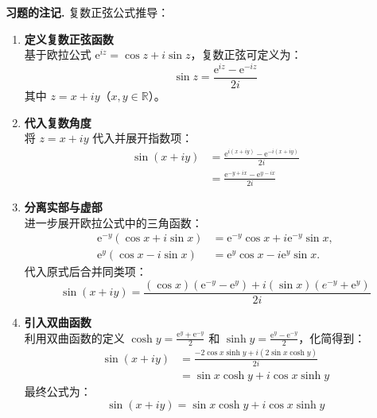 \documentclass[11pt]{ctexart}
\newcounter{problemname}
\newenvironment{note}{\par\noindent\textbf{习题\arabic{problemname}的注记. }}{\par}
\begin{document}
\begin{note}
    复数正弦公式推导：
    \begin{enumerate}
        \item \textbf{定义复数正弦函数}\\  
        基于欧拉公式 $\text{e}^{iz} = \cos z + i \sin z$，复数正弦可定义为：
        $$
        \sin z = \frac{\text{e}^{iz} - \text{e}^{-iz}}{2i}
        $$
        其中 $z = x + iy$（$x, y \in \mathbb{R}$）。
    
        \item \textbf{代入复数角度}\\ 
        将 $z = x + iy$ 代入并展开指数项：
        $$
        \begin{aligned}
            \sin(x + iy) &= \frac{\text{e}^{i(x + iy)} - \text{e}^{-i(x + iy)}}{2i} \\
            &= \frac{\text{e}^{-y + ix} - \text{e}^{y - ix}}{2i}
        \end{aligned}
        $$

        \item \textbf{分离实部与虚部}\\
        进一步展开欧拉公式中的三角函数：
        $$
        \begin{aligned}
            \text{e}^{-y} (\cos x + i \sin x) &= \text{e}^{-y} \cos x + i \text{e}^{-y} \sin x, \\
            \text{e}^{y} (\cos x - i \sin x) &= \text{e}^{y} \cos x - i \text{e}^{y} \sin x.
        \end{aligned}
        $$
        代入原式后合并同类项：
        $$
        \sin(x + iy) = \frac{(\cos x)(\text{e}^{-y} - \text{e}^{y}) + i (\sin x)(e^{-y} + \text{e}^{y})}{2i}
        $$
    
        \item \textbf{引入双曲函数}\\
        利用双曲函数的定义 $\displaystyle\cosh y = \frac{\text{e}^{y} + \text{e}^{-y}}{2}$ 和 $\displaystyle\sinh y = \frac{\text{e}^{y} - \text{e}^{-y}}{2}$，化简得到：
        $$
        \begin{aligned}
            \sin(x + iy) &= \frac{-2\cos x \sinh y + i (2 \sin x \cosh y)}{2i} \\
            &= \sin x \cosh y + i \cos x \sinh y
        \end{aligned}
        $$
        最终公式为：
        \begin{equation*}
            \boxed{ \sin(x + iy) = \sin x \cosh y + i \cos x \sinh y }
        \end{equation*}
    \end{enumerate}
\end{note}
\end{document}
